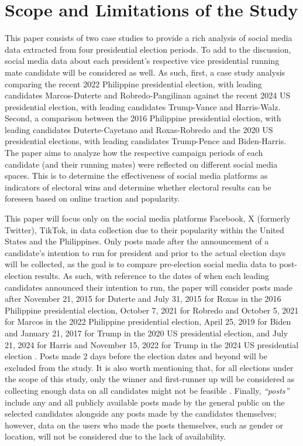 \section{Scope and Limitations of the Study}
This paper consists of two case studies to provide a rich analysis of social media data extracted from four presidential election periods. To add to the discussion, social media data about each president’s respective vice presidential running mate candidate will be considered as well. As such, first, a case study analysis comparing the recent 2022 Philippine presidential election, with leading candidates Marcos-Duterte and Robredo-Pangilinan against the recent 2024 US presidential election, with leading candidates Trump-Vance and Harris-Walz. Second, a comparison between the 2016 Philippine presidential election, with leading candidates Duterte-Cayetano and Roxas-Robredo and the 2020 US presidential elections, with leading candidates Trump-Pence and Biden-Harris. The paper aims to analyze how the respective campaign periods of each candidate (and their running mates) were reflected on different social media spaces. This is to determine the effectiveness of social media platforms as indicators of electoral wins and determine whether electoral results can be foreseen based on online traction and popularity.

This paper will focus only on the social media platforms Facebook, X (formerly Twitter), TikTok, in data collection due to their popularity within the United States and the Philippines. Only posts made after the announcement of a candidate’s intention to run for president and prior to the actual election days will be collected, as the goal is to compare pre-election social media data to post-election results. As such, with reference to the dates of when each leading candidates announced their intention to run, the paper will consider posts made after November 21, 2015 for Duterte and July 31, 2015 for Roxas in the 2016 Philippine presidential election, October 7, 2021 for Robredo and October 5, 2021 for Marcos in the 2022 Philippine presidential election, April 25, 2019 for Biden and January 21, 2017 for Trump in the 2020 US presidential election, and July 21, 2024 for Harris and November 15, 2022 for Trump in the 2024 US presidential election \cite{SaL_Ranada-2015, SaL_Cupin-2015, SaL_Lalu-2021, SaL_Buan-2021,SaL_Beaumont-2019,SaL_Gold-2017,SaL_Viner-2024, SaL_Orr-2022}. Posts made 2 days before the election dates and beyond will be excluded from the study. It is also worth mentioning that, for all elections under the scope of this study, only the winner and first-runner up will be considered as collecting enough data on all candidates might not be feasible \cite{RRL_Macrohon-2022}. Finally, \emph{“posts”} include any and all publicly available posts made by the general public on the selected candidates alongside any posts made by the candidates themselves; however, data on the users who made the posts themselves, such as gender or location, will not be considered due to the lack of availability.

